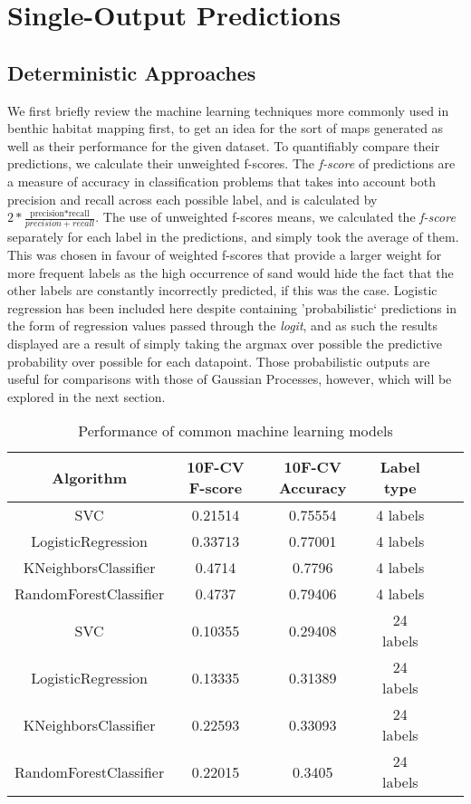\section{Single-Output Predictions}

\subsection{Deterministic Approaches}

We first briefly review the machine learning techniques more commonly used in benthic habitat mapping first, to get an idea for the sort of maps generated as well as their performance for the given dataset. To quantifiably compare their predictions, we calculate their unweighted f-scores. The \textit{f-score} of predictions are a measure of accuracy in classification problems that takes into account both precision and recall across each possible label, and is calculated by $2*\frac{\text{precision*recall}}{precision+recall}$. The use of unweighted f-scores means, we calculated the \textit{f-score} separately for each label in the predictions, and simply took the average of them. This was chosen in favour of weighted f-scores that provide a larger weight for more frequent labels as the high occurrence of sand would hide the fact that the other labels are constantly incorrectly predicted, if this was the case. Logistic regression has been included here despite containing 'probabilistic` predictions in the form of regression values passed through the \textit{logit}, and as such the results displayed are a result of simply taking the argmax over possible the predictive probability over possible for each datapoint. Those probabilistic outputs are useful for comparisons with those of Gaussian Processes, however, which will be explored in the next section. 

\begin{table}
    \centering
\begin{tabular}{|c|c|c|c|c|c|}
    \hline
    Algorithm & 10F-CV F-score & 10F-CV Accuracy & Label type\\\hline
    SVC & 0.21514 & 0.75554 & 4 labels \\
    LogisticRegression & 0.33713 & 0.77001 & 4 labels \\
    KNeighborsClassifier & 0.4714 & 0.7796 & 4 labels \\
    RandomForestClassifier & 0.4737 & 0.79406 & 4 labels \\
    SVC & 0.10355 & 0.29408 & 24 labels \\
    LogisticRegression & 0.13335 & 0.31389 & 24 labels \\
    KNeighborsClassifier & 0.22593 & 0.33093 & 24 labels \\
    RandomForestClassifier & 0.22015 & 0.3405 & 24 labels \\
    \hline
\end{tabular}
\label{table:detresults}
    \caption{Performance of common machine learning models}
\end{table}

